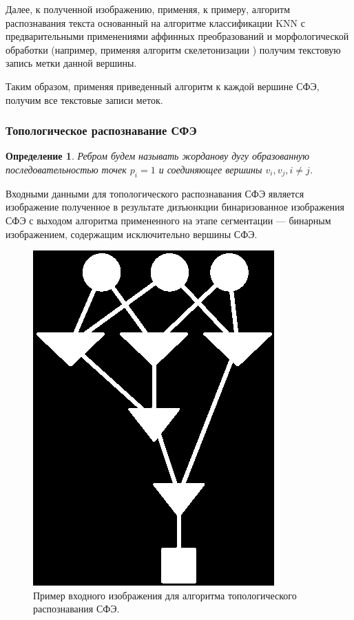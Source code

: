 \documentclass[makeidx, a4paper, 14pt]{extarticle}
\newtheorem{definition}{Определение}
\begin{document}
Далее, к полученной изображению, применяя, к примеру, алгоритм распознавания текста основанный на алгоритме классификации KNN \cite{knn}
с предварительными применениями аффинных преобразований и морфологической обработки (например, применяя алгоритм скелетонизации \cite{zhang_suen84})
получим текстовую запись метки данной вершины.

Таким образом, применяя приведенный алгоритм к каждой вершине СФЭ, получим все текстовые записи меток.

\subsubsection{Топологическое распознавание СФЭ}

\begin{definition}
    Ребром будем называть жорданову дугу образованную последовательностью точек ${p_i=1}$
    и соединяющее вершины ${v_i, v_j, i \neq j}$.
\end{definition}


Входными данными для топологического распознавания СФЭ является изображение полученное в результате дизъюнкции бинаризованное изображения СФЭ
с выходом алгоритма примененного на этапе сегментации --- бинарным изображением, содержащим исключительно вершины СФЭ.

\begin{figure}[H]
    \centering
    \includegraphics[scale=0.75]{img4_binarized_bfd.png}
    \caption{Пример входного изображения для алгоритма топологического распознавания СФЭ.}
    \label{fig:bfd}
\end{figure}
\end{document}
